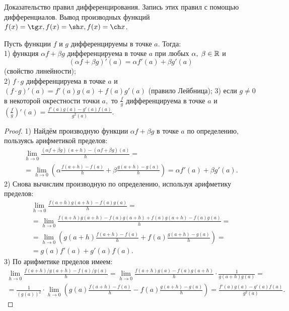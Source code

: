 \begin{problem}
Доказательство правил дифференцирования. Запись этих правил с помощью дифференциалов. Вывод производных функций $f(x) = \tg x, f(x) = \sh x, f(x) = \ch x$.
\end{problem}\begin{proposition}
    Пусть функции $f$ и $g$ дифференцируемы
    в точке $a.$ Тогда:\\
    1) функция $\alpha f+\beta g$ дифференцируема
    в точке $a$ при любых $\alpha,\;\beta\in \mathbb{R}$
    и $$(\alpha f+\beta g)'(a)=
        \alpha f'(a)+\beta g'(a)$$
    (свойство линейности);\\
    2) $f\cdot g$ дифференцируема в точке $a$
    и $(f\cdot g)'(a)=f'(a)g(a)+f(a)g'(a)$
    (правило Лейбница);
    3) если $g\neq0$ в некоторой окрестности
    точки $a,$ то  $\frac{f}{g}$ дифференцируема
    в точке $a$ и $\left(\frac{f}{g}\right)'(a)=
        \frac{f'(a)g(a)-g'(a)f(a)}{g^2(a)}.$
\end{proposition}
\begin{proof}
    1) Найдём производную функции $\alpha f+\beta g$
    в точке $a$ по определению, пользуясь арифметикой
    пределов:
    \begin{multline*}
        \lim\limits_{h\rightarrow0}
        \frac{(\alpha f+\beta g)(a+h)-
            (\alpha f+\beta g)(a)}{h}=\\
        =\lim\limits_{h\rightarrow0}
        \left(\alpha\frac{f(a+h)-f(a)}{h}
        +\beta\frac{g(a+h)-g(a)}{h}\right)=
        \alpha f'(a)+\beta g'(a).
    \end{multline*}
    2) Снова вычислим производную по определению,
    используя арифметику пределов:
    \begin{multline*}
        \lim\limits_{h\rightarrow0}
        \frac{f(a+h)g(a+h)-f(a)g(a)}{h}=\\=
        \lim\limits_{h\rightarrow0}
        \frac{f(a+h)g(a+h)-f(a)g(a+h)+
            f(a)g(a+h)-f(a)g(a)}{h}=\\=
        \lim\limits_{h\rightarrow0}
        \left(g(a+h)\frac{f(a+h)-f(a)}{h}+
        f(a)\frac{g(a+h)-g(a)}{h}\right)=\\=
        g(a)f'(a)+g'(a)f(a).
    \end{multline*}
    3) По арифметике пределов имеем:
    \begin{multline*}
        \lim\limits_{h\rightarrow0}
        \frac{f(a+h)/g(a+h)-f(a)/g(a)}{h}=
        \lim\limits_{h\rightarrow0}
        \frac{f(a+h)g(a)-f(a)g(a+h)}{h}\cdot
        \frac{1}{g(a+h)g(a)}=\\=
        \frac{1}{(g(a))^2}\cdot\lim\limits_{h\rightarrow0}
        \left(g(a)\frac{f(a+h)-f(a)}{h}-
        f(a)\frac{g(a+h)-g(a)}{h}\right)=
        \frac{f'(a)g(a)-g'(a)f(a)}{g^2(a)}.
    \end{multline*}
\end{proof}
